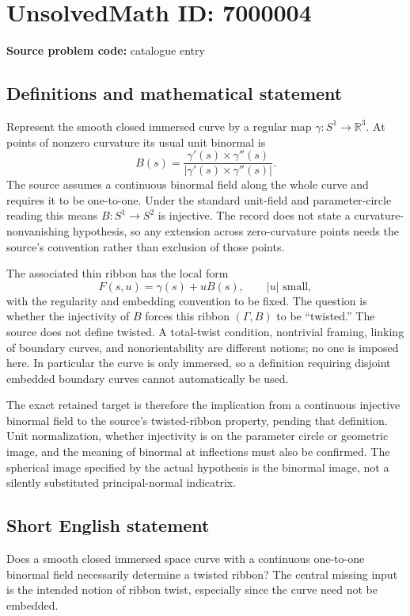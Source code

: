 \documentclass[11pt]{article}
\newcommand{\R}{\mathbb{R}}
\begin{document}
\section*{UnsolvedMath ID: 7000004}
\textbf{Source problem code:} catalogue entry
\subsection{Definitions and mathematical statement}
Represent the smooth closed immersed curve by a regular map $\gamma:S^1\to\R^3$. At points of nonzero curvature its usual unit binormal is
\[
 B(s)=\frac{\gamma'(s)\times\gamma''(s)}
            {|\gamma'(s)\times\gamma''(s)|}.
\]
The source assumes a continuous binormal field along the whole curve and requires it to be one-to-one. Under the standard unit-field and parameter-circle reading this means $B:S^1\to S^2$ is injective. The record does not state a curvature-nonvanishing hypothesis, so any extension across zero-curvature points needs the source's convention rather than exclusion of those points.

The associated thin ribbon has the local form
\[
 F(s,u)=\gamma(s)+uB(s),\qquad |u|\text{ small},
\]
with the regularity and embedding convention to be fixed. The question is whether the injectivity of $B$ forces this ribbon $(\Gamma,B)$ to be ``twisted.'' The source does not define twisted. A total-twist condition, nontrivial framing, linking of boundary curves, and nonorientability are different notions; no one is imposed here. In particular the curve is only immersed, so a definition requiring disjoint embedded boundary curves cannot automatically be used.

The exact retained target is therefore the implication from a continuous injective binormal field to the source's twisted-ribbon property, pending that definition. Unit normalization, whether injectivity is on the parameter circle or geometric image, and the meaning of binormal at inflections must also be confirmed. The spherical image specified by the actual hypothesis is the binormal image, not a silently substituted principal-normal indicatrix.
\subsection{Short English statement}
Does a smooth closed immersed space curve with a continuous one-to-one binormal field necessarily determine a twisted ribbon? The central missing input is the intended notion of ribbon twist, especially since the curve need not be embedded.
\end{document}

